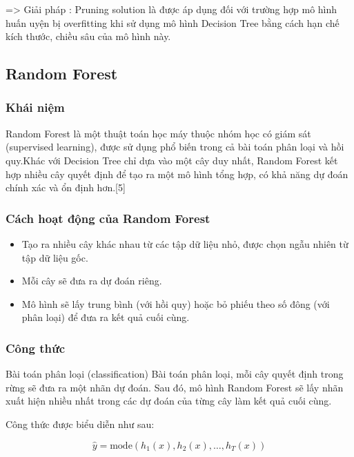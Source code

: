 \documentclass[
]{article}
\begin{document}
=\textgreater{} Giải pháp : Pruning solution là được áp dụng đối với
trường hợp mô hình huấn uyện bị overfitting khi sử dụng mô hình Decision
Tree bằng cách hạn chế kích thước, chiều sâu của mô hình này.

\subsection{Random Forest}\label{random-forest}

\subsubsection{Khái niệm}\label{khuxe1i-niux1ec7m-4}

Random Forest là một thuật toán học máy thuộc nhóm học có giám sát
(supervised learning), được sử dụng phổ biến trong cả bài toán phân loại
và hồi quy.Khác với Decision Tree chỉ dựa vào một cây duy nhất, Random
Forest kết hợp nhiều cây quyết định để tạo ra một mô hình tổng hợp, có
khả năng dự đoán chính xác và ổn định hơn.{[}5{]}

\subsubsection{Cách hoạt động của Random
Forest}\label{cuxe1ch-houx1ea1t-ux111ux1ed9ng-cux1ee7a-random-forest}

\begin{itemize}
\item
  Tạo ra nhiều cây khác nhau từ các tập dữ liệu nhỏ, được chọn ngẫu
  nhiên từ tập dữ liệu gốc.
\item
  Mỗi cây sẽ đưa ra dự đoán riêng.
\item
  Mô hình sẽ lấy trung bình (với hồi quy) hoặc bỏ phiếu theo số đông
  (với phân loại) để đưa ra kết quả cuối cùng.
\end{itemize}

\subsubsection{Công thức}\label{cuxf4ng-thux1ee9c-1}

Bài toán phân loại (classification) Bài toán phân loại, mỗi cây quyết
định trong rừng sẽ đưa ra một nhãn dự đoán. Sau đó, mô hình Random
Forest sẽ lấy nhãn xuất hiện nhiều nhất trong các dự đoán của từng cây
làm kết quả cuối cùng.

Công thức được biểu diễn như sau:

\[
\hat{y} = \text{mode}(h_1(x), h_2(x), \ldots, h_T(x))
\]
\end{document}
